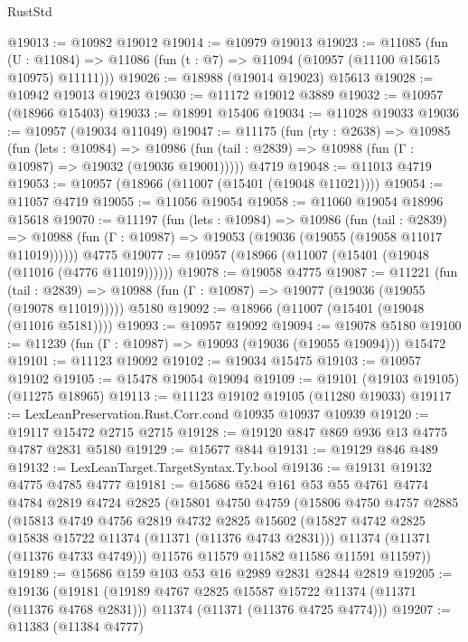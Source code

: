 \begin{lexlean}{RustStd}
\begin{coremodule}
{\begin{coremodule}
{{{{{{{{{{{{{{{{{{{{{{{{{{{{{{{{{@19013 := @10982 @19012
@19014 := @10979 @19013
@19023 := @11085
    (fun (U : @11084) => @11086 (fun (t : @7) => @11094 (@10957 (@11100 @15615 @10975) @11111)))
@19026 := @18988 (@19014 @19023) @15613
@19028 := @10942 @19013 @19023
@19030 := @11172 @19012 @3889
@19032 := @10957 (@18966 @15403)
@19033 := @18991 @15406
@19034 := @11028 @19033
@19036 := @10957 (@19034 @11049)
@19047 := @11175
    (fun (rty : @2638) =>
    @10985
      (fun (lets : @10984) =>
      @10986 (fun (tail : @2839) => @10988 (fun (Γ : @10987) => @19032 (@19036 @19001)))))
    @4719
@19048 := @11013 @4719
@19053 := @10957 (@18966 (@11007 (@15401 (@19048 @11021))))
@19054 := @11057 @4719
@19055 := @11056 @19054
@19058 := @11060 @19054 @18996 @15618
@19070 := @11197
    (fun (lets : @10984) =>
    @10986
      (fun (tail : @2839) =>
      @10988 (fun (Γ : @10987) => @19053 (@19036 (@19055 (@19058 @11017 @11019))))))
    @4775
@19077 := @10957 (@18966 (@11007 (@15401 (@19048 (@11016 (@4776 @11019))))))
@19078 := @19058 @4775
@19087 := @11221
    (fun (tail : @2839) => @10988 (fun (Γ : @10987) => @19077 (@19036 (@19055 (@19078 @11019)))))
    @5180
@19092 := @18966 (@11007 (@15401 (@19048 (@11016 @5181))))
@19093 := @10957 @19092
@19094 := @19078 @5180
@19100 := @11239 (fun (Γ : @10987) => @19093 (@19036 (@19055 @19094))) @15472
@19101 := @11123 @19092
@19102 := @19034 @15475
@19103 := @10957 @19102
@19105 := @15478 @19054 @19094
@19109 := @19101 (@19103 @19105) (@11275 @18965)
@19113 := @11123 @19102 @19105 (@11280 @19033)
@19117 := LexLeanPreservation.Rust.Corr.cond @10935 @10937 @10939
@19120 := @19117 @15472 @2715 @2715
@19128 := @19120 @847 @869 @936 @13 @4775 @4787 @2831 @5180
@19129 := @15677 @844
@19131 := @19129 @846 @489
@19132 := LexLeanTarget.TargetSyntax.Ty.bool
@19136 := @19131 @19132 @4775 @4785 @4777
@19181 := @15686
    @524
    @161
    @53
    @55
    @4761
    @4774
    @4784
    @2819
    @4724
    @2825
    (@15801
      @4750
      @4759
      (@15806
        @4750
        @4757
        @2885
        (@15813
          @4749
          @4756
          @2819
          @4732
          @2825
          @15602
          (@15827 @4742 @2825 @15838 @15722 @11374 (@11371 (@11376 @4743 @2831)))
          @11374
          (@11371 (@11376 @4733 @4749)))
        @11576
        @11579
        @11582
        @11586
        @11591
        @11597))
@19189 := @15686 @159 @103 @53 @16 @2989 @2831 @2844 @2819
@19205 := @19136
    (@19181
      (@19189 @4767 @2825 @15587 @15722 @11374 (@11371 (@11376 @4768 @2831)))
      @11374
      (@11371 (@11376 @4725 @4774)))
@19207 := @11383 (@11384 @4777)
}}}}}}}}}}}}}}}}}}}}}}}}}}}}}}}}}
\end{coremodule}}
\end{coremodule}
\end{lexlean}

